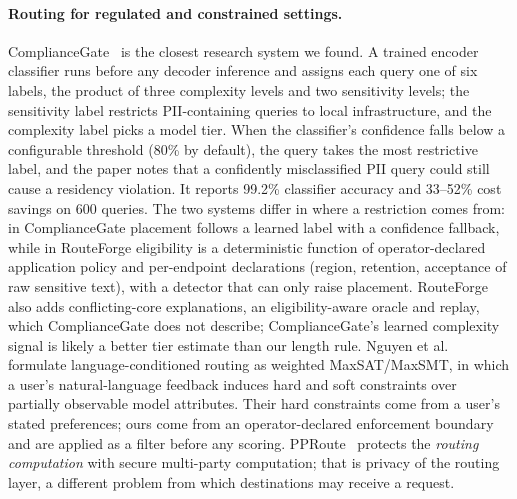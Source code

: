 \documentclass[11pt]{article}
\begin{document}
\paragraph{Routing for regulated and constrained settings.} ComplianceGate~\cite{compliancegate}
is the closest research system we found. A trained encoder classifier runs before any decoder
inference and assigns each query one of six labels, the product of three complexity levels and
two sensitivity levels; the sensitivity label restricts PII-containing queries to local
infrastructure, and the complexity label picks a model tier. When the classifier's confidence
falls below a configurable threshold (80\% by default), the query takes the most restrictive
label, and the paper notes that a confidently misclassified PII query could still cause a
residency violation. It reports 99.2\% classifier accuracy and 33--52\% cost savings on 600
queries. The two systems differ in where a restriction comes from: in ComplianceGate placement
follows a learned label with a confidence fallback, while in RouteForge eligibility is a
deterministic function of operator-declared application policy and per-endpoint declarations
(region, retention, acceptance of raw sensitive text), with a detector that can only raise
placement. RouteForge also adds conflicting-core explanations, an eligibility-aware oracle and
replay, which ComplianceGate does not describe; ComplianceGate's learned complexity signal is likely a
better tier estimate than our length rule. Nguyen et al.~\cite{maxsat} formulate
language-conditioned routing as weighted MaxSAT/MaxSMT, in which a user's natural-language
feedback induces hard and soft constraints over partially observable model attributes. Their
hard constraints come from a user's stated preferences; ours come from an operator-declared
enforcement boundary and are applied as a filter before any scoring. PPRoute~\cite{pproute} protects the
\emph{routing computation} with secure multi-party computation; that is privacy of the routing
layer, a different problem from which destinations may receive a request.
\end{document}
